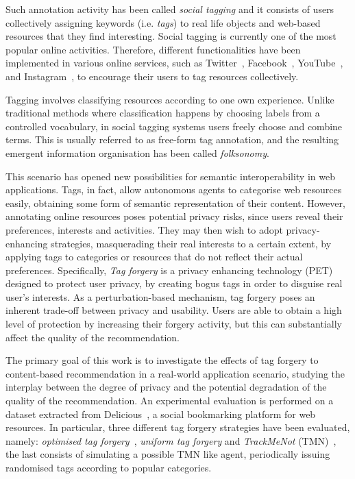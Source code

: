 Such annotation activity has been called \emph{social tagging} and it consists of users collectively assigning keywords (i.e. \emph{tags}) to real life objects and web-based resources that they find interesting. Social tagging is currently one of the most popular online activities. Therefore, different functionalities have been implemented in various online services, such as Twitter~\cite{twitter}, Facebook~\cite{facebook}, YouTube~\cite{youtube}, and Instagram~\cite{instagram}, to encourage their users to tag resources collectively.

Tagging involves classifying resources according to one own experience. Unlike traditional methods where classification happens by choosing labels from a controlled vocabulary, in social tagging systems users freely choose and combine terms. This is usually referred to as free-form tag annotation, and the resulting emergent information organisation has been called \emph{folksonomy}.

This scenario has opened new possibilities for semantic interoperability in web applications. Tags, in fact, allow autonomous agents to categorise web resources easily, obtaining some form of semantic representation of their content.
However, annotating online resources poses potential privacy risks, since users reveal their preferences, interests and activities. They may then wish to adopt privacy-enhancing strategies, masquerading their real interests to a certain extent, by applying tags to categories or resources that do not reflect their actual preferences. Specifically, \emph{Tag forgery} is a privacy enhancing technology (PET) designed to protect user privacy, by creating bogus tags in order to disguise real user's interests. As a perturbation-based mechanism, tag forgery poses an inherent trade-off between privacy and usability. Users are able to obtain a high level of protection by increasing their forgery activity, but this can substantially affect the quality of the recommendation.

The primary goal of this work is to investigate the effects of tag forgery to content-based recommendation in a real-world application scenario, studying the interplay between the degree of privacy and the potential degradation of the quality of the recommendation. An experimental evaluation is performed on a dataset extracted from Delicious~\cite{delicious}, a social bookmarking platform for web resources. In particular, three different tag forgery strategies have been evaluated, namely: \emph{optimised tag forgery}~\cite{Rebollo10IT}, \emph{uniform tag forgery} and \emph{TrackMeNot} (TMN)~\cite{Howe06B}, the last consists of simulating a possible TMN like agent, periodically issuing randomised tags according to popular categories.

